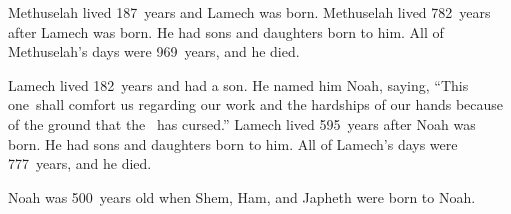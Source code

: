 \begin{inparaenum}
   Methuselah lived 187~years and Lamech was born.%
   Methuselah lived 782~years after Lamech was born. He had sons and daughters born to him.%
   All of Methuselah's days were 969~years, and he died.%

   Lamech lived 182~years and had a son.%
   He named him Noah, saying, ``This one\understood{}\ shall comfort us regarding our work and the hardships of our hands because of the ground that the \lord\ has cursed.''%
   Lamech lived 595~years after Noah was born. He had sons and daughters born to him.%
   All of Lamech's days were 777~years, and he died.%

   Noah was 500~years old when Shem, Ham, and Japheth were born to Noah.%
\end{inparaenum}
